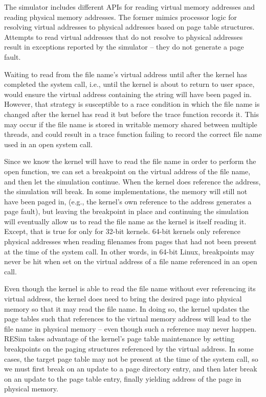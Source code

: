 \documentclass[titlepage]{article}
\begin{document}
The simulator includes different APIs for reading virtual memory addresses and reading physical memory addresses.
The former mimics processor logic for resolving virtual addresses to physical addresses based on page table
structures. Attempts to read virtual addresses that do not resolve to physical addresses result in exceptions reported
by the simulator -- they do not generate a page fault.

Waiting to read from the file name's virtual address until after the kernel has completed the system call, i.e.,
until the kernel is about to return to user space, would ensure the virtual address containing the string
will have been paged in.  However, that strategy is susceptible to a race condition in which the file
name is changed after the kernel has read it but before the trace function records it.  This may occur
if the file name is stored in writable memory shared between multiple threads, and could result in a trace function
failing to record the correct file name used in an open system call.
 
Since we know the kernel will have to read the file name in order to perform the open function, we
can set a breakpoint on the virtual address of the file name, and then let the simulation continue. 
When the kernel does reference the address, the simulation will break.  In some implementations, the
memory will still not have been paged in, (e.g., the kernel's own reference to the address generates a page fault),
but leaving the breakpoint in place and continuing the simulation
will eventually allow us to read the file name as the kernel is itself reading it.  Except, that is true for only 
for 32-bit kernels.  64-bit kernels only reference physical addresses when reading filenames from pages that had
not been present at the time of the system call.  In other words,
in 64-bit Linux, breakpoints may never be hit when set on the virtual address of a file name referenced in an open call.

Even though the kernel is able to read the file name without ever referencing its virtual address, the kernel does
need to bring the desired page into physical memory so that it may read the file name.  In doing so, the kernel
updates the page tables such that references to the virtual memory address will lead to the file name in
physical memory – even though such a reference may never happen.  RESim takes advantage of the kernel’s
page table maintenance by setting breakpoints on the paging structures referenced by the virtual address.
In some cases, the target page table may not be present at the time of the system call, so we must first
break on an update to a page directory entry, and then later break on an update to the page table entry,
finally yielding address of the page in physical memory.
\end{document}
